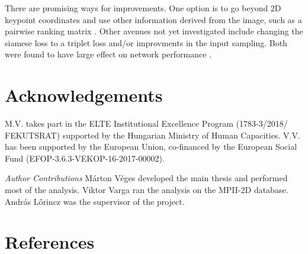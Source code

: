 \documentclass[preprint]{elsarticle}
\begin{document}
There are promising ways for improvements. One option is to go beyond 2D keypoint coordinates and use other information derived from the image, such as a pairwise ranking matrix \cite{drpose}. Other avenues not yet investigated include changing the siamese loss to a triplet loss and/or improvments in the input sampling. Both were found to have large effect on network performance \cite{facenet,amazon_siamese-sampling}.

\section*{Acknowledgements}
M.V. takes part in the ELTE Institutional Excellence Program (1783-3/2018/ FEKUTSRAT) supported by the Hungarian Ministry of Human Capacities. V.V. has been supported by the European Union, co-financed by the European Social Fund (EFOP-3.6.3-VEKOP-16-2017-00002). 

\textit{Author Contributions} M\'arton V\'eges developed the main thesis and performed most of the analysis. Viktor Varga ran the analysis on the MPII-2D database. Andr\'as L\H{o}rincz was the supervisor of the project.


\section*{References}


\end{document}
